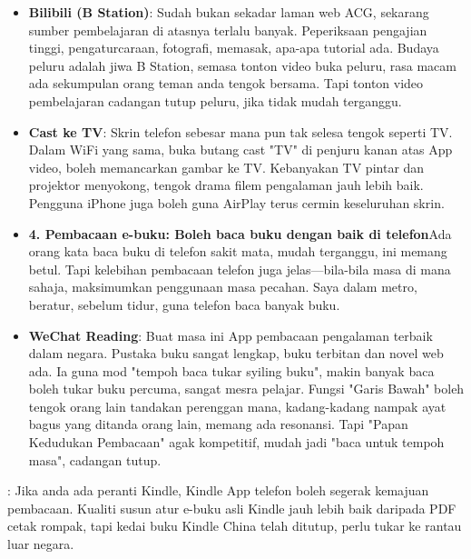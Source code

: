 \begin{itemize}
  \item \textbf{Bilibili (B Station)}: Sudah bukan sekadar laman web ACG, sekarang sumber pembelajaran di atasnya terlalu banyak. Peperiksaan pengajian tinggi, pengaturcaraan, fotografi, memasak, apa-apa tutorial ada. Budaya peluru adalah jiwa B Station, semasa tonton video buka peluru, rasa macam ada sekumpulan orang teman anda tengok bersama. Tapi tonton video pembelajaran cadangan tutup peluru, jika tidak mudah terganggu.
  \item \textbf{Cast ke TV}: Skrin telefon sebesar mana pun tak selesa tengok seperti TV. Dalam WiFi yang sama, buka butang cast "TV" di penjuru kanan atas App video, boleh memancarkan gambar ke TV. Kebanyakan TV pintar dan projektor menyokong, tengok drama filem pengalaman jauh lebih baik. Pengguna iPhone juga boleh guna AirPlay terus cermin keseluruhan skrin.
  \item \textbf{4. Pembacaan e-buku: Boleh baca buku dengan baik di telefon}Ada orang kata baca buku di telefon sakit mata, mudah terganggu, ini memang betul. Tapi kelebihan pembacaan telefon juga jelas—bila-bila masa di mana sahaja, maksimumkan penggunaan masa pecahan. Saya dalam metro, beratur, sebelum tidur, guna telefon baca banyak buku.
  \item \textbf{WeChat Reading}: Buat masa ini App pembacaan pengalaman terbaik dalam negara. Pustaka buku sangat lengkap, buku terbitan dan novel web ada. Ia guna mod "tempoh baca tukar syiling buku", makin banyak baca boleh tukar buku percuma, sangat mesra pelajar. Fungsi "Garis Bawah" boleh tengok orang lain tandakan perenggan mana, kadang-kadang nampak ayat bagus yang ditanda orang lain, memang ada resonansi. Tapi "Papan Kedudukan Pembacaan" agak kompetitif, mudah jadi "baca untuk tempoh masa", cadangan tutup.
\end{itemize}


: Jika anda ada peranti Kindle, Kindle App telefon boleh segerak kemajuan pembacaan. Kualiti susun atur e-buku asli Kindle jauh lebih baik daripada PDF cetak rompak, tapi kedai buku Kindle China telah ditutup, perlu tukar ke rantau luar negara.

